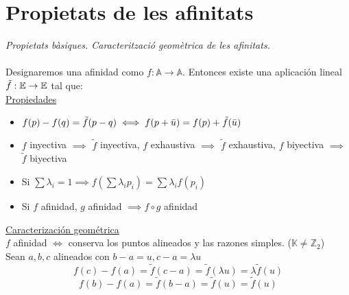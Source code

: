 \documentclass{article}
\newcommand{\A}{\mathbb{A}}
\newcommand{\E}{\mathbb{E}}
\begin{document}
\section{Propietats de les afinitats}
\textit{Propietats bàsiques. Caracterització geomètrica de les
afinitats.} \\  
\\
Designaremos una afinidad como $f:\A \to \A$. Entonces existe una aplicación lineal $\Tilde{f}: \E \to \E$ tal que: \\
\underline{Propiedades}
\begin{itemize}
    \item $f(p)-f(q) = \Tilde{f}(p-q) \iff f(p+\Bar{u}) = f(p) + \Tilde{f}(\Bar{u})$
    \item $f$ inyectiva $\implies$ $\tilde{f}$ inyectiva, $f$ exhaustiva $\implies$ $\tilde{f}$ exhaustiva, $f$ biyectiva $\implies$ $\tilde{f}$ biyectiva
    \item Si $\sum \lambda_i = 1 \implies f(\sum \lambda_ip_i)=\sum \lambda_if(p_i)$
    \item Si $f$ afinidad, $g$ afinidad $\implies f\circ g$ afinidad
\end{itemize}
\underline{Caracterización geométrica} \\
$f$ afinidad $\iff$ conserva los puntos alineados y las razones simples. ($\mathbb{K}\neq\mathbb{Z}_2$) \\
Sean $a, b, c$ alineados con $b-a = u, c-a=\lambda u$
\[f(c)-f(a) = \tilde{f}(c-a)=\tilde{f}(\lambda u)= \lambda \tilde{f}(u)\]
\[f(b)-f(a) = \tilde{f}(b-a)=\tilde{f}(u)=\tilde{f}(u)\]
\end{document}
